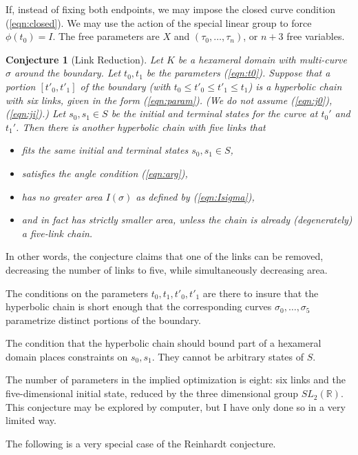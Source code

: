 \documentclass[11pt]{amsart}
\newtheorem{conj}[equation]{Conjecture}
\newcommand{\ring}[1]{\mathbb{#1}}
\def\rR{{\ring{R}}}
\def\ta{{\tau}}
\begin{document}
If, instead of fixing both endpoints, we may impose the closed
curve condition (\ref{eqn:closed}). We may use the action of
the special linear group to force $\phi(t_0)=I$.  The free
parameters are $X$ and $(\ta_0,\ldots,\ta_n)$, or $n+3$ free
variables.  



\begin{conj}[Link Reduction] \label{conj:defrag} Let $K$ be a
  hexameral domain with multi-curve $\sigma$ around the boundary.  Let
  $t_0,t_1$ be the parameters (\ref{eqn:t0}).  Suppose that a portion
  $[t'_0,t'_1]$ of the boundary (with $t_0\le t'_0\le t'_1\le t_1$) is
  a hyperbolic chain with six links, given in the form
  (\ref{eqn:param}).  (We do not assume (\ref{eqn:j0}),
  (\ref{eqn:ji}).)  Let $s_0,s_1\in S$ be the initial and terminal
  states for the curve at $t_0'$ and $t_1'$.  Then there is
  another hyperbolic chain with five links that
\begin{itemize}
\item fits the same initial and terminal states $s_0,s_1\in S$,
\item satisfies the angle condition (\ref{eqn:arg}),
\item has no greater area $I(\sigma)$ as defined by (\ref{eqn:Isigma}),
\item and in fact has strictly smaller area, unless the chain is already (degenerately) a 
five-link chain.
\end{itemize}
\end{conj}

In other words, the conjecture claims that one of the links can
be removed, decreasing the number of links to five, while
simultaneously decreasing area.

The conditions on the parameters $t_0,t_1,t'_0,t'_1$ are there to
insure that the hyperbolic chain is short enough that the
corresponding curves $\sigma_0,\ldots,\sigma_5$ parametrize distinct
portions of the boundary.

The condition that the hyperbolic chain should bound part of a hexameral
domain places constraints on $s_0,s_1$.  They cannot be arbitrary
states of $S$.

The number of parameters in the implied optimization is eight: six
links and the five-dimensional initial state, reduced by the three
dimensional group $SL_2(\rR)$.  This conjecture may be explored by
computer, but I have only done so in a very limited way.

\bigskip

The following is a very special case of the Reinhardt conjecture.
\end{document}
